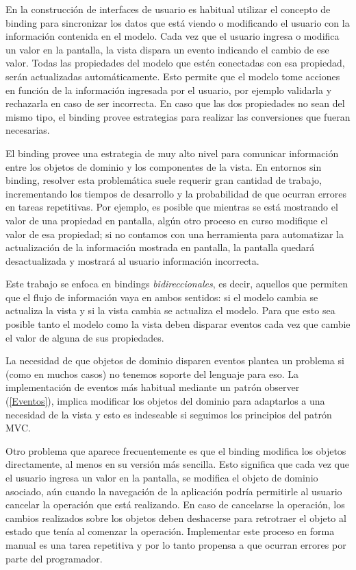 	En la construcción de interfaces de usuario es habitual utilizar el concepto de
	binding para sincronizar los datos que está viendo o modificando el usuario
	con la información contenida en el modelo.
	Cada vez que el usuario ingresa o modifica un valor en la pantalla, la
	vista dispara un evento indicando el cambio de ese valor. Todas las
	propiedades del modelo que estén conectadas con esa propiedad, serán
	actualizadas automáticamente.
	Esto permite que el modelo tome acciones en función de la información ingresada por el usuario, 
	por ejemplo validarla y rechazarla en caso de ser incorrecta.
	En caso que las dos propiedades no sean del mismo tipo, el binding provee
	estrategias para realizar las conversiones que fueran necesarias.
		
	\bigskip

	El binding provee una estrategia de muy alto nivel para comunicar información entre
	los objetos de dominio y los componentes de la vista.
	En entornos sin binding, resolver esta problemática suele requerir gran
	cantidad de trabajo, incrementando los tiempos de desarrollo y la probabilidad
	de que ocurran errores en tareas repetitivas.
	Por ejemplo, es posible que mientras se está mostrando el valor de una
	propiedad en pantalla, algún otro proceso en curso modifique el valor de esa propiedad; 
	si no contamos con una herramienta
	para automatizar la actualización de la información mostrada en
	pantalla, la pantalla quedará desactualizada y mostrará al usuario información incorrecta.

	\medskip

	Este trabajo se enfoca en bindings \emph{bidireccionales}, es decir, aquellos
	que permiten que el flujo de información vaya en ambos sentidos: si el
	modelo cambia se actualiza la vista y si la vista cambia se actualiza el
	modelo.
	Para que esto sea posible tanto el modelo como la vista deben disparar eventos 
	cada vez que cambie el valor de alguna de sus propiedades.
	
	La necesidad de que objetos de dominio disparen eventos plantea un problema si (como en muchos casos) 
	no tenemos soporte del lenguaje para eso.
	La implementación de eventos más habitual mediante un patrón observer (\ref{Eventos}), 
	implica modificar los objetos del dominio para adaptarlos a una necesidad de la vista y
	esto es indeseable si seguimos los principios del patrón MVC.
	
	Otro problema que aparece frecuentemente es que el binding modifica los objetos
	directamente, al menos en su versión más sencilla. 
	Esto significa que cada vez que el usuario ingresa un valor en la pantalla,
	se modifica el objeto de dominio asociado, aún cuando la navegación de la aplicación podría
	permitirle al usuario cancelar la operación que está realizando.
	En caso de cancelarse la operación, los cambios realizados sobre los objetos
	deben deshacerse para retrotraer el objeto al estado que tenía al comenzar la
	operación. Implementar este proceso en forma manual es una tarea repetitiva y
	por lo tanto propensa a que ocurran errores por parte del programador.
	
